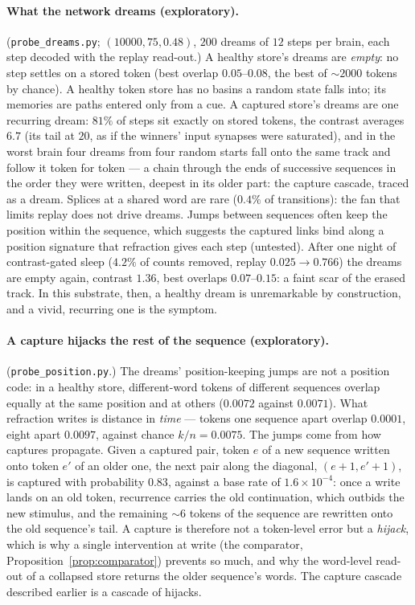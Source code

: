 \documentclass[11pt]{article}
\theoremstyle{definition}
\theoremstyle{plain}
\begin{document}
\paragraph{What the network dreams (exploratory).} (\texttt{probe\_dreams.py};
$(10000,75,0.48)$, $200$ dreams of $12$ steps per brain, each step decoded with the
replay read-out.) A healthy store's dreams are \emph{empty}: no step settles on a
stored token (best overlap $0.05$--$0.08$, the best of $\sim 2000$ tokens by chance).
A healthy token store has no basins a random state falls into; its memories are
paths entered only from a cue. A captured store's dreams are one recurring
dream: $81\%$ of steps sit exactly on stored tokens, the contrast averages $6.7$
(its tail at $20$, as if the winners' input synapses were saturated), and in the
worst brain four dreams from four random starts fall onto the same track and
follow it token for token --- a chain through the ends of successive sequences in
the order they were written, deepest in its older part: the capture cascade,
traced as a dream. Splices at a shared word are rare ($0.4\%$ of transitions):
the fan that limits replay does not drive dreams. Jumps between sequences often
keep the position within the sequence, which suggests the captured links bind
along a position signature that refraction gives each step (untested). After one
night of contrast-gated sleep ($4.2\%$ of counts removed, replay $0.025 \to 0.766$)
the dreams are empty again, contrast $1.36$, best overlaps $0.07$--$0.15$: a faint
scar of the erased track. In this substrate, then, a healthy dream is
unremarkable by construction, and a vivid, recurring one is the symptom.

\paragraph{A capture hijacks the rest of the sequence (exploratory).}
(\texttt{probe\_position.py}.) The dreams' position-keeping jumps are not a
position code: in a healthy store, different-word tokens of different sequences
overlap equally at the same position and at others ($0.0072$ against $0.0071$).
What refraction writes is distance in \emph{time} --- tokens one sequence apart
overlap $0.0001$, eight apart $0.0097$, against chance $k/n = 0.0075$. The jumps come
from how captures propagate. Given a captured pair, token $e$ of a new sequence
written onto token $e'$ of an older one, the next pair along the diagonal,
$(e+1, e'+1)$, is captured with probability $0.83$, against a base rate of $1.6
\times 10^{-4}$: once a write lands on an old token, recurrence carries the old
continuation, which outbids the new stimulus, and the remaining $\sim 6$ tokens of
the sequence are rewritten onto the old sequence's tail. A capture is therefore
not a token-level error but a \emph{hijack}, which is why a single intervention at
write (the comparator, Proposition~\ref{prop:comparator}) prevents so much, and
why the word-level read-out of a collapsed store returns the older sequence's
words. The capture cascade described earlier is a cascade of hijacks.
\end{document}
